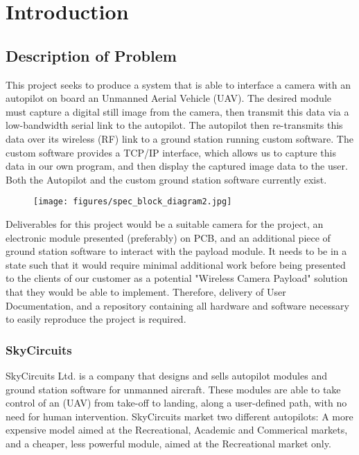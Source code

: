 \chapter{Introduction}

\section{Description of Problem}

This project seeks to produce a system that is able to interface a camera 
with an autopilot on board an Unmanned Aerial Vehicle (UAV). The desired 
module must capture a digital still image from the camera, then transmit 
this data via a low-bandwidth serial link to the autopilot. The autopilot 
then re-transmits this data over its wireless (RF) link to a ground station 
running custom software. The custom software provides a TCP/IP interface, 
which allows us to capture this data in our own program, and then display 
the captured image data to the user. Both the Autopilot and the custom ground 
station software currently exist.

\begin{figure}[H]
        \centering
        \texttt{[image: figures/spec\_block\_diagram2.jpg]}
        \label{fig:blockDiagram}
\end{figure}

Deliverables for this project would be a suitable camera for the project, 
an electronic module presented (preferably) on PCB, and an additional 
piece of ground station software to interact with the payload module. It 
needs to be in a state such that it would require minimal additional work 
before being presented to the clients of our customer as a potential "Wireless Camera Payload" solution that they would be able to implement. 
Therefore, delivery of User Documentation, and a repository containing all 
hardware and software necessary to easily reproduce the project is required.

\subsection{SkyCircuits}

SkyCircuits Ltd. \cite{SkyCircuits} is a company that designs and sells 
autopilot modules and ground station software for unmanned aircraft. These 
modules are able to take control of an (UAV) from take-off to landing, 
along a user-defined path, with no need for human intervention. SkyCircuits 
market two different autopilots: A more expensive model aimed at the 
Recreational, Academic and Commerical markets, and a cheaper, less powerful 
module, aimed at the Recreational market only.

